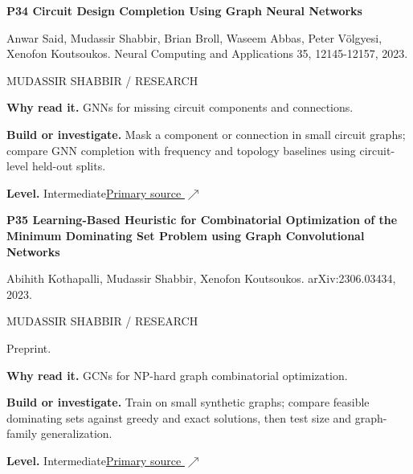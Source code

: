 \documentclass[11pt,letterpaper]{article}
\begin{document}
\begin{minipage}{\linewidth}
{\large\bfseries P34 Circuit Design Completion Using Graph Neural Networks}\par
Anwar Said, Mudassir Shabbir, Brian Broll, Waseem Abbas, Peter V\"olgyesi, Xenofon Koutsoukos. Neural Computing and Applications 35, 12145-12157, 2023.\par
\textcolor{ink}{\small MUDASSIR SHABBIR / RESEARCH}\par
\textbf{Why read it.} GNNs for missing circuit components and connections.\par
\textbf{Build or investigate.} Mask a component or connection in small circuit graphs; compare GNN completion with frequency and topology baselines using circuit-level held-out splits.\par
\textbf{Level.} Intermediate\quad\href{https://doi.org/10.1007/s00521-023-08346-x}{Primary source $\nearrow$}\par
\end{minipage}\par\vspace{10pt}
\begin{minipage}{\linewidth}
{\large\bfseries P35 Learning-Based Heuristic for Combinatorial Optimization of the Minimum Dominating Set Problem using Graph Convolutional Networks}\par
Abihith Kothapalli, Mudassir Shabbir, Xenofon Koutsoukos. arXiv:2306.03434, 2023.\par
\textcolor{ink}{\small MUDASSIR SHABBIR / RESEARCH}\par
{\small Preprint.}\par
\textbf{Why read it.} GCNs for NP-hard graph combinatorial optimization.\par
\textbf{Build or investigate.} Train on small synthetic graphs; compare feasible dominating sets against greedy and exact solutions, then test size and graph-family generalization.\par
\textbf{Level.} Intermediate\quad\href{https://arxiv.org/abs/2306.03434}{Primary source $\nearrow$}\par
\end{minipage}\par\vspace{10pt}
\end{document}
